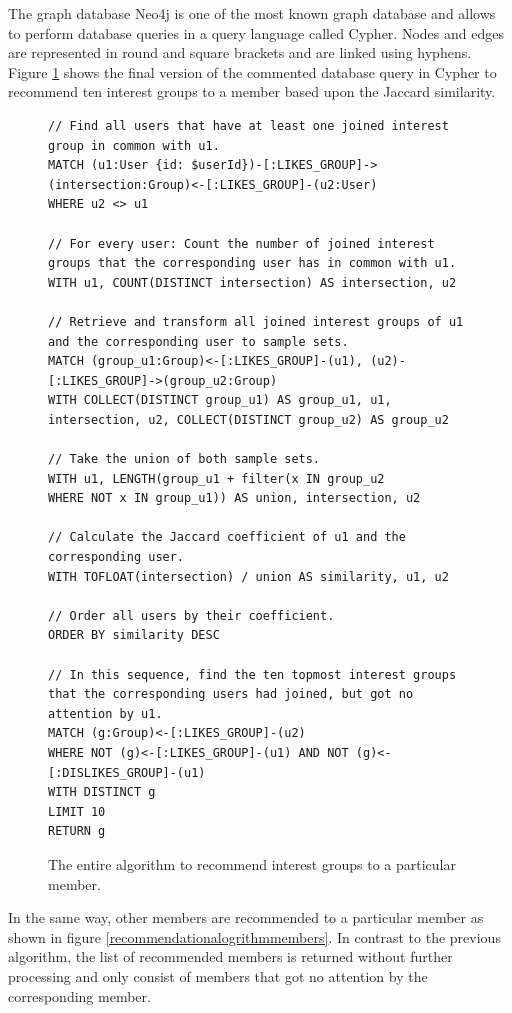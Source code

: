 \documentclass[12pt,numbers=noenddot,parskip,bibliography=totocnumbered,listof=totocnumbered,draft]{scrreprt}
\begin{document}
The graph database Neo4j \citep{neo4j} is one of the most known graph database and allows to perform database queries in a query language called Cypher. Nodes and edges are represented in round and square brackets and are linked using hyphens. Figure \ref{recommendationalogrithminterestgroups} shows the final version of the commented database query in Cypher to recommend ten interest groups to a member based upon the Jaccard similarity.

\begin{figure}
\centering
\begin{lstlisting}
// Find all users that have at least one joined interest group in common with u1.
MATCH (u1:User {id: $userId})-[:LIKES_GROUP]->(intersection:Group)<-[:LIKES_GROUP]-(u2:User) 
WHERE u2 <> u1 

// For every user: Count the number of joined interest groups that the corresponding user has in common with u1.
WITH u1, COUNT(DISTINCT intersection) AS intersection, u2 

// Retrieve and transform all joined interest groups of u1 and the corresponding user to sample sets.
MATCH (group_u1:Group)<-[:LIKES_GROUP]-(u1), (u2)-[:LIKES_GROUP]->(group_u2:Group) 
WITH COLLECT(DISTINCT group_u1) AS group_u1, u1, intersection, u2, COLLECT(DISTINCT group_u2) AS group_u2 

// Take the union of both sample sets.
WITH u1, LENGTH(group_u1 + filter(x IN group_u2 
WHERE NOT x IN group_u1)) AS union, intersection, u2 

// Calculate the Jaccard coefficient of u1 and the corresponding user. 
WITH TOFLOAT(intersection) / union AS similarity, u1, u2 

// Order all users by their coefficient.
ORDER BY similarity DESC 

// In this sequence, find the ten topmost interest groups that the corresponding users had joined, but got no attention by u1.
MATCH (g:Group)<-[:LIKES_GROUP]-(u2) 
WHERE NOT (g)<-[:LIKES_GROUP]-(u1) AND NOT (g)<-[:DISLIKES_GROUP]-(u1) 
WITH DISTINCT g
LIMIT 10
RETURN g
\end{lstlisting}
\caption[Algorithm to recommend interest groups]{The entire algorithm to recommend interest groups to a particular member.}
\label{recommendationalogrithminterestgroups}
\end{figure}

In the same way, other members are recommended to a particular member as shown in figure \ref{recommendationalogrithmmembers}. In contrast to the previous algorithm, the list of recommended members is returned without further processing and only consist of members that got no attention by the corresponding member.
\end{document}
